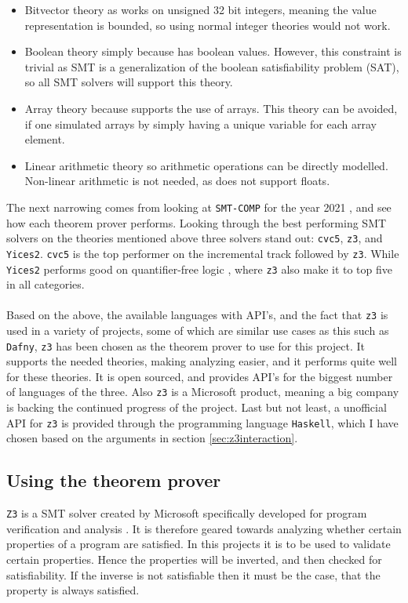\begin{itemize}
    \item Bitvector theory as \lan works on unsigned 32 bit integers, meaning the value
          representation is bounded, so using normal integer theories would not work.

    \item Boolean theory simply because \lan has boolean values. However, this constraint is
          trivial as SMT is a generalization of the boolean satisfiability problem (SAT), so
          all SMT solvers will support this theory.

    \item Array theory because \lan supports the use of arrays. This theory can be avoided, if
          one simulated arrays by simply having a unique variable for each array element.

    \item Linear arithmetic theory so arithmetic operations can be directly modelled. Non-linear
          arithmetic is not needed, as \lan does not support floats.
\end{itemize}
\noindent
The next narrowing comes from looking at \texttt{SMT-COMP} for the year 2021 \cite{smtcomp}, and see
how each theorem prover performs. Looking through the best performing SMT solvers on the theories
mentioned above three solvers stand out: \texttt{cvc5}, \texttt{z3}, and \texttt{Yices2}.
\texttt{cvc5} is the top performer on the incremental track \cite{smtcomincr} followed by
\texttt{z3}. While \texttt{Yices2} performs good on quantifier-free logic \cite{smtcommod},
where \texttt{z3} also make it to top five in all categories.
\\
\\
Based on the above, the available languages with API's, and the fact that \texttt{z3} is used in
a variety of projects, some of which are similar use cases as this such as \texttt{Dafny},
\texttt{z3} has been chosen as the theorem prover to use for this project. It supports the
needed theories, making analyzing \lan easier, and it performs quite well for these
theories. It is open sourced, and provides API's for the biggest number of languages of the three.
Also \texttt{z3} is a Microsoft product, meaning a big company is backing the continued
progress of the project. Last but not least, a unofficial API for \texttt{z3} is provided
through the programming language \texttt{Haskell}, which I have chosen based on the arguments
in section \ref{sec:z3interaction}.


\subsection{Using the theorem prover }
\texttt{Z3} is a SMT solver created by Microsoft specifically developed
for program verification and analysis \cite{z3:microsoft}. It is therefore geared towards
analyzing whether certain properties of a program are satisfied. In this projects it is to be
used to validate certain properties. Hence the properties will be inverted, and then checked for
satisfiability. If the inverse is not satisfiable then it must be the case, that the property
is always satisfied.

